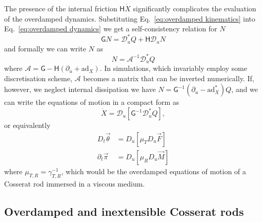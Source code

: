 The presence of the internal friction $\mathsf{H} \dot{X}$ significantly complicates the evaluation of the overdamped dynamics. Substituting Eq.~\ref{eq:overdamped kinematics} into Eq.~\ref{eq:overdamped dynamics} we get a self-consistency relation for $N$
\begin{equation}
\mathsf{G} N = \mathcal{D}^*_u Q + \mathsf{H} \mathcal{D}_u N
\end{equation}
and formally we can write $N$ as
\begin{equation}
N = \mathscr{A}^{-1} \mathcal{D}^*_u Q
\end{equation}
where $\mathscr{A} = \mathsf{G} - \mathsf{H} (\partial_u + \text{ad}_X)$. In simulations, which invariably employ some discretisation scheme, $\mathscr{A}$ becomes a matrix that can be inverted numerically. If, however, we neglect internal dissipation we have $N = \mathsf{G}^{-1} \left( \partial_u - \text{ad}_X^* \right) Q$, and we can write the equations of motion in a compact form as
\begin{equation} \label{eq:Cosserat rod overdamped dynamics}
\dot{X}  = \mathcal{D}_u \left[ \mathsf{G}^{-1} \mathcal{D}^*_u Q \right],
\end{equation}
or equivalently
\begin{subequations} 
\begin{align}
D_t \vec{\theta} & = D_u \left[ \mu_T D_u \vec{F} \right] \label{eq:overdamped cosserat rod theta eom} \\
\partial_t \vec{\pi} & = D_u \left[ \mu_R  D_u \vec{M} \right] 
\end{align}
\end{subequations}
where $\mu_{T,R} = \gamma_{T,R}^{-1}$, which would be the overdamped equations of motion of a Cosserat rod immersed in a viscous medium. 

\subsection{Overdamped and inextensible Cosserat rods} \label{sec:Overdamped and inextensible Cosserat rods}

